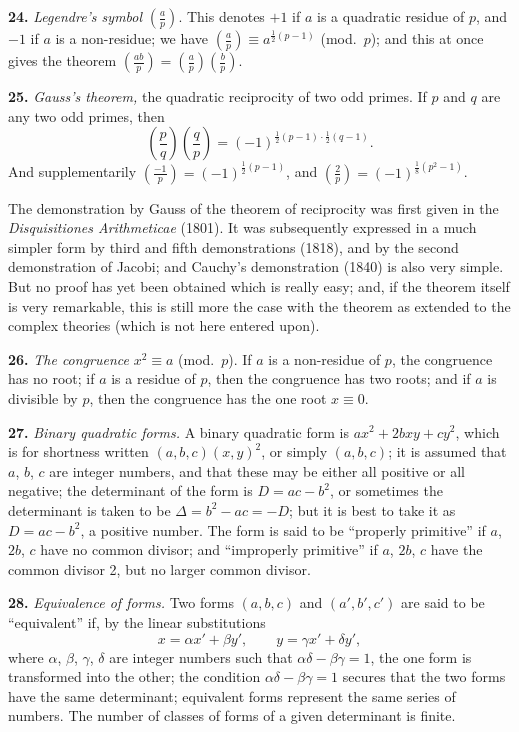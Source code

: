 \documentclass[11pt,a4paper]{article}
\begin{document}
\textbf{24.}\quad
\textit{Legendre's symbol} $\left(\frac{a}{p}\right)$. This denotes $+1$ if $a$ is a quadratic residue of $p$, and $-1$ if $a$ is a non-residue; we have $\left(\frac{a}{p}\right) \equiv a^{\frac{1}{2}(p-1)}$ (mod.\ $p$); and this at once gives the theorem $\left(\frac{ab}{p}\right) = \left(\frac{a}{p}\right)\left(\frac{b}{p}\right)$.

\textbf{25.}\quad
\textit{Gauss's theorem,} the quadratic reciprocity of two odd primes. If $p$ and $q$ are any two odd primes, then
\[
\left(\frac{p}{q}\right)\left(\frac{q}{p}\right) = (-1)^{\frac{1}{2}(p-1) \cdot \frac{1}{2}(q-1)}.
\]
And supplementarily $\left(\frac{-1}{p}\right) = (-1)^{\frac{1}{2}(p-1)}$, and $\left(\frac{2}{p}\right) = (-1)^{\frac{1}{8}(p^{2}-1)}$.

The demonstration by Gauss of the theorem of reciprocity was first given in the \textit{Disquisitiones Arithmeticae} (1801). It was subsequently expressed in a much simpler form by third and fifth demonstrations (1818), and by the second demonstration of Jacobi; and Cauchy's demonstration (1840) is also very simple. But no proof has yet been obtained which is really easy; and, if the theorem itself is very remarkable, this is still more the case with the theorem as extended to the complex theories (which is not here entered upon).

\textbf{26.}\quad
\textit{The congruence} $x^{2} \equiv a$ (mod.\ $p$). If $a$ is a non-residue of $p$, the congruence has no root; if $a$ is a residue of $p$, then the congruence has two roots; and if $a$ is divisible by $p$, then the congruence has the one root $x \equiv 0$.

\textbf{27.}\quad
\textit{Binary quadratic forms.} A binary quadratic form is $ax^{2} + 2bxy + cy^{2}$, which is for shortness written $(a, b, c)(x, y)^{2}$, or simply $(a, b, c)$; it is assumed that $a$, $b$, $c$ are integer numbers, and that these may be either all positive or all negative; the determinant of the form is $D = ac - b^{2}$, or sometimes the determinant is taken to be $\Delta = b^{2} - ac = -D$; but it is best to take it as $D = ac - b^{2}$, a positive number. The form is said to be ``properly primitive'' if $a$, $2b$, $c$ have no common divisor; and ``improperly primitive'' if $a$, $2b$, $c$ have the common divisor 2, but no larger common divisor.

\textbf{28.}\quad
\textit{Equivalence of forms.} Two forms $(a, b, c)$ and $(a', b', c')$ are said to be ``equivalent'' if, by the linear substitutions
\[
x = \alpha x' + \beta y', \qquad y = \gamma x' + \delta y',
\]
where $\alpha$, $\beta$, $\gamma$, $\delta$ are integer numbers such that $\alpha\delta - \beta\gamma = 1$, the one form is transformed into the other; the condition $\alpha\delta - \beta\gamma = 1$ secures that the two forms have the same determinant; equivalent forms represent the same series of numbers. The number of classes of forms of a given determinant is finite.
\end{document}
